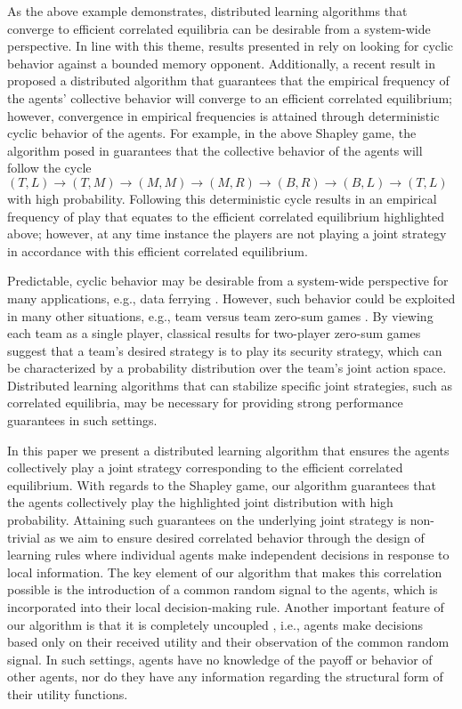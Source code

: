 As the above example demonstrates, distributed learning algorithms that converge to efficient correlated equilibria can be desirable from a system-wide perspective.  In line with this theme, results presented in \cite{Lim2014} rely on looking for cyclic behavior against a bounded memory opponent. Additionally, a recent result in \cite{Marden2013c} proposed a distributed algorithm that guarantees that the empirical frequency of the agents' collective behavior will converge to an efficient correlated equilibrium; however, convergence in empirical frequencies is attained through deterministic cyclic behavior of the agents.   For example, in the above Shapley game, the algorithm posed in \cite{Marden2013c} guarantees that the collective behavior of the agents will follow the cycle 
%
$ (T,L)  \rightarrow (T,M) \rightarrow (M,M) \rightarrow (M,R) \rightarrow (B,R) \rightarrow (B,L) \rightarrow (T,L)$
%
with high probability.  Following this deterministic cycle results in an empirical frequency of play that equates to the efficient correlated equilibrium highlighted above; however, at any time instance the players are not playing a joint strategy in accordance with this efficient correlated equilibrium.    


Predictable, cyclic behavior may be desirable from a system-wide perspective for many applications, e.g., data ferrying \cite{Carfang2013}. However, such behavior could be exploited in many other situations, e.g., team versus team zero-sum games \cite{Ho1974, Stengel1997}.  By viewing each team as a single player, classical results for two-player zero-sum games suggest that a team's desired strategy is to play its security strategy, which can be characterized by a probability distribution over the team's joint action space. %
Distributed learning algorithms that can stabilize specific joint strategies, such as correlated equilibria, may be necessary for providing strong performance guarantees in such settings.  

In this paper we present a distributed learning algorithm that ensures the agents collectively play a joint strategy corresponding to the efficient correlated equilibrium.  With regards to the Shapley game, our algorithm guarantees that the agents collectively play the highlighted joint distribution with high probability.  Attaining such guarantees on the underlying joint strategy is non-trivial as we aim to ensure desired correlated behavior through the design of learning rules where individual agents make independent decisions in response to local information.  The key element of our algorithm that makes this correlation possible is the introduction of a common random signal to the agents, which is incorporated into their local decision-making rule.  Another important feature of our algorithm is that it is completely uncoupled \cite{Foster2006}, i.e., agents make decisions based only on their received utility and their observation of the common random signal.  In such settings, agents have no knowledge of the payoff or behavior of other agents, nor do they have any information regarding the structural form of their utility functions.   

